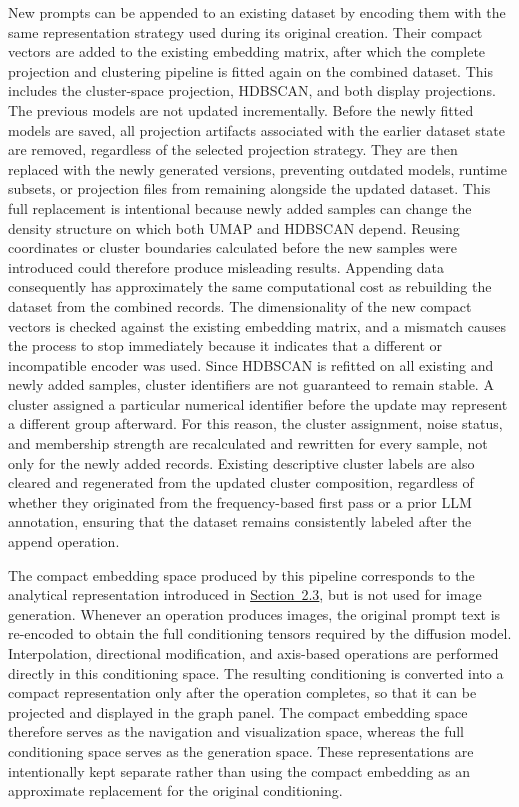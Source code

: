 New prompts can be appended to an existing dataset by encoding them with the same representation strategy used during its original creation. Their compact vectors are added to the existing embedding matrix, after which the complete projection and clustering pipeline is fitted again on the combined dataset. This includes the cluster-space projection, HDBSCAN, and both display projections. The previous models are not updated incrementally.
Before the newly fitted models are saved, all projection artifacts associated with the earlier dataset state are removed, regardless of the selected projection strategy. They are then replaced with the newly generated versions, preventing outdated models, runtime subsets, or projection files from remaining alongside the updated dataset. This full replacement is intentional because newly added samples can change the density structure on which both UMAP and HDBSCAN depend. Reusing coordinates or cluster boundaries calculated before the new samples were introduced could therefore produce misleading results.
Appending data consequently has approximately the same computational cost as rebuilding the dataset from the combined records. The dimensionality of the new compact vectors is checked against the existing embedding matrix, and a mismatch causes the process to stop immediately because it indicates that a different or incompatible encoder was used.
Since HDBSCAN is refitted on all existing and newly added samples, cluster identifiers are not guaranteed to remain stable. A cluster assigned a particular numerical identifier before the update may represent a different group afterward. For this reason, the cluster assignment, noise status, and membership strength are recalculated and rewritten for every sample, not only for the newly added records. Existing descriptive cluster labels are also cleared and regenerated from the updated cluster composition, regardless of whether they originated from the frequency-based first pass or a prior LLM annotation, ensuring that the dataset remains consistently labeled after the append operation.

The compact embedding space produced by this pipeline corresponds to the analytical representation introduced in \hyperref[sec:2.3]{Section~2.3}, but is not used for image generation. Whenever an operation produces images, the original prompt text is re-encoded to obtain the full conditioning tensors required by the diffusion model. Interpolation, directional modification, and axis-based operations are performed directly in this conditioning space. The resulting conditioning is converted into a compact representation only after the operation completes, so that it can be projected and displayed in the graph panel. The compact embedding space therefore serves as the navigation and visualization space, whereas the full conditioning space serves as the generation space. These representations are intentionally kept separate rather than using the compact embedding as an approximate replacement for the original conditioning.


